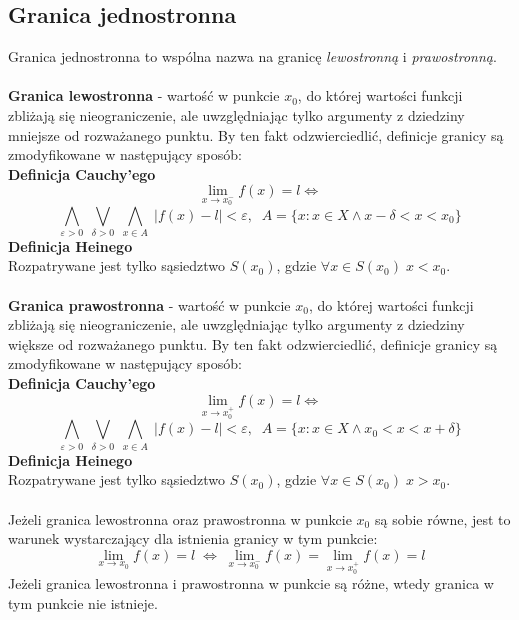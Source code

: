 \documentclass[14pt,a4paper]{extarticle}
\begin{document}
\subsection{Granica jednostronna}
\noindent Granica jednostronna to wspólna nazwa na granicę \textit{lewostronną} i \textit{prawostronną}.\\\\
\noindent\textbf{Granica lewostronna} - wartość w punkcie $x_{0}$, do której wartości funkcji zbliżają się nieograniczenie,
ale uwzględniając tylko argumenty z dziedziny mniejsze od rozważanego punktu. By ten fakt odzwierciedlić, definicje
granicy są zmodyfikowane w następujący sposób:\\

\noindent\textbf{Definicja Cauchy'ego}
$$\lim_{x\to x_{0}^{-}} f(x) = l \Leftrightarrow $$
$$\underset{\varepsilon > 0}{\bigwedge} \;\underset{\delta > 0}{\bigvee} \; \underset{x \in A}{\bigwedge} \; \vert f(x) - l\vert < \varepsilon, \;\; A = \{x:x\in X \land x - \delta < x < x_{0}\}$$
\noindent\textbf{Definicja Heinego}\\
Rozpatrywane jest tylko sąsiedztwo $S(x_{0})$, gdzie $\forall x \in S(x_{0})\; x < x_{0}$.\\\\

\noindent\textbf{Granica prawostronna} - wartość w punkcie $x_{0}$, do której wartości funkcji zbliżają się nieograniczenie,
ale uwzględniając tylko argumenty z dziedziny większe od rozważanego punktu. By ten fakt odzwierciedlić, definicje
granicy są zmodyfikowane w następujący sposób:\\

\noindent\textbf{Definicja Cauchy'ego}
$$\lim_{x\to x_{0}^{+}} f(x) = l \Leftrightarrow $$
$$\underset{\varepsilon > 0}{\bigwedge} \;\underset{\delta > 0}{\bigvee} \; \underset{x \in A}{\bigwedge} \; \vert f(x) - l\vert < \varepsilon, \;\; A = \{x:x\in X \land x_{0} < x < x + \delta\}$$
\noindent\textbf{Definicja Heinego}\\
Rozpatrywane jest tylko sąsiedztwo $S(x_{0})$, gdzie $\forall x \in S(x_{0})\; x > x_{0}$.\\\\

\noindent Jeżeli granica lewostronna oraz prawostronna w punkcie $x_{0}$ są sobie równe, jest to warunek wystarczający
dla istnienia granicy w tym punkcie:
$$\lim_{x\to x_{0}}f(x) = l \; \Leftrightarrow \; \lim_{x\to x_{0}^{-}}f(x) = \lim_{x\to x_{0}^{+}}f(x) = l$$
Jeżeli granica lewostronna i prawostronna w punkcie są różne, wtedy granica w tym punkcie nie istnieje.\\
\end{document}
